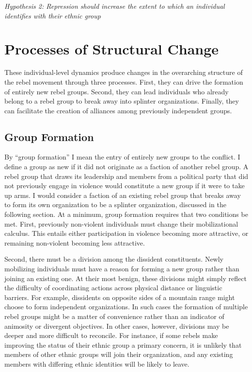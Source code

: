 \documentclass[12pt,]{book}
\theoremstyle{definition}
\theoremstyle{definition}
\theoremstyle{definition}
\theoremstyle{remark}
\begin{document}
\emph{Hypothesis 2: Repression should increase the extent to which an
individual identifies with their ethnic group}

\hypertarget{processes-of-structural-change}{%
\section{Processes of Structural
Change}\label{processes-of-structural-change}}

These individual-level dynamics produce changes in the overarching
structure of the rebel movement through three processes. First, they can
drive the formation of entirely new rebel groups. Second, they can lead
individuals who already belong to a rebel group to break away into
splinter organizations. Finally, they can facilitate the creation of
alliances among previously independent groups.

\hypertarget{group-formation-1}{%
\subsection{Group Formation}\label{group-formation-1}}

By ``group formation'' I mean the entry of entirely new groups to the
conflict. I define a group as new if it did not originate as a faction
of another rebel group. A rebel group that draws its leadership and
members from a political party that did not previously engage in
violence would constitute a new group if it were to take up arms. I
would consider a faction of an existing rebel group that breaks away to
form its own organization to be a splinter organization, discussed in
the following section. At a minimum, group formation requires that two
conditions be met. First, previously non-violent individuals must change
their mobilizational calculus. This entails either participation in
violence becoming more attractive, or remaining non-violent becoming
less attractive.

Second, there must be a division among the dissident constituents. Newly
mobilizing individuals must have a reason for forming a new group rather
than joining an existing one. At their most benign, these divisions
might simply reflect the difficulty of coordinating actions across
physical distance or linguistic barriers. For example, dissidents on
opposite sides of a mountain range might choose to form independent
organizations. In such cases the formation of multiple rebel groups
might be a matter of convenience rather than an indicator of animosity
or divergent objectives. In other cases, however, divisions may be
deeper and more difficult to reconcile. For instance, if some rebels
make improving the status of their ethnic group a primary concern, it is
unlikely that members of other ethnic groups will join their
organization, and any existing members with differing ethnic identities
will be likely to leave.
\end{document}
